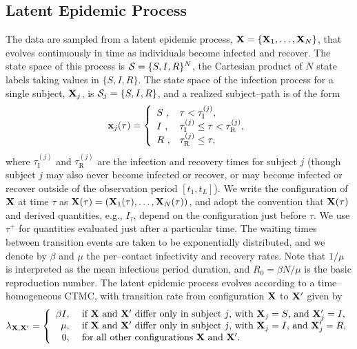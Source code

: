 \subsection{Latent Epidemic Process}
\label{subsec:bda_pop_proc}
The data are sampled from a latent epidemic process, $ \mathbf{X} = \lbrace \mathbf{X}_1,\dots,\mathbf{X}_N\rbrace $, that evolves continuously in time  as individuals become infected and recover. The state space of this process is $ \mathcal{S} = \lbrace S,I,R\rbrace^N $, the Cartesian product of $ N $ state labels taking values in $ \lbrace S,I,R\rbrace $. The state space of the infection process for a single subject, $ \mathbf{X}_j $, is $\mathcal{S}_j = \lbrace S, I, R\rbrace $, and a realized subject--path is of the form 
\begin{equation} \mathbf{x}_j(\tau) = \left \lbrace \begin{array}{ll}
S\ ,& \tau < \tau^{(j)}_{\mathrm{I}},\\
I\ ,& \tau^{(j)}_{\mathrm{I}} \leq \tau < \tau^{(j)}_{\mathrm{R}},\\
R\ ,& \tau^{(j)}_{\mathrm{R}} \leq \tau,
\end{array} \right . \end{equation} 
where $ \tau^{(j)}_{\mathrm{I}} $ and $ \tau^{(j)}_{\mathrm{R}} $ are the infection and recovery times for subject $ j $ (though subject $ j $ may also never become infected or recover, or may become infected or recover outside of the observation period $ [t_1,t_L] $). We write the configuration of $ \mathbf{X} $ at time $ \tau $ as $ \mathbf{X}(\tau) = \left (\mathbf{X}_1(\tau),\dots,\mathbf{X}_N(\tau)\right ) $, and adopt the convention that $ \mathbf{X}(\tau) $ and derived quantities, e.g., $ I_\tau $, depend on the configuration just before $ \tau $. We  use $ \tau^+ $ for quantities evaluated just after a particular time. The waiting times between transition events are taken to be exponentially distributed, and we denote by $ \beta $ and $ \mu $ the per--contact infectivity and recovery rates. Note that $ 1/\mu $ is interpreted as the mean infectious period duration, and $ R_0=\beta N/\mu $ is the basic reproduction number. The latent epidemic process evolves according to a time--homogeneous CTMC, with transition rate from configuration $ \mathbf{X} $ to $ \mathbf{X}^\prime $ given by
\begin{equation}
\lambda_{\mathbf{X},\mathbf{X}^\prime} = \left \lbrace \begin{array}{rl}
\beta I,\ &\text{if } \mathbf{X}\ \text{and } \mathbf{X}^\prime\ \text{differ only in subject }j \text{, with }\mathbf{X}_j=S\text{, and }\mathbf{X}_j^\prime=I,\\
\mu,\ &\text{if } \mathbf{X}\ \text{and } \mathbf{X}^\prime\ \text{differ only in subject }j \text{, with }\mathbf{X}_j=I\text{, and }\mathbf{X}_j^\prime=R,\\
0,\ & \text{for all other configurations }\mathbf{X}\ \text{and }\mathbf{X}^\prime.
\end{array}\right.
\end{equation}
